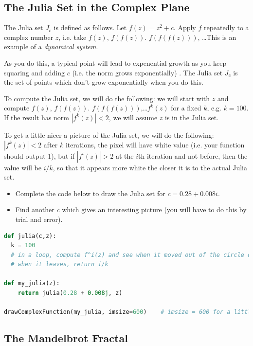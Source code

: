 \documentclass[letterpaper,11pt]{amsart}
\theoremstyle{plain}
\theoremstyle{definition}
\begin{document}
\subsection*{The Julia Set in the Complex Plane} 

The Julia set $J_c$ is defined as follows. Let $f(z) = z^2 + c$. Apply $f$ repeatedly to a complex number $z$, i.e. take $f(z)$, $f(f(z))$. $f(f(f(z)))$, \dots This is an example of a \emph{dynamical system}. 

As you do this, a typical point will lead to expenential growth as you keep squaring and adding $c$ (i.e. the norm grows exponentially) . The Julia set $J_c$ is the set of points which don't grow exponentially when you do this.  

To compute the Julia set, we will do the following: we will start with $z$ and compute  $f(z)$, $f(f(z))$. $f(f(f(z)))$,\dots $f^k(z)$ for a fixed $k$, e.g. $k = 100$. If the result has norm $|f^k(z)| < 2$, we will assume $z$ is in the Julia set. 

To get a little nicer a picture of the Julia set, we will do the following:  $|f^k(z)| < 2$ after $k$ iterations, the pixel will have white value (i.e. your function should output 1), but if $|f^i(z)| > 2$ at the $i$th iteration and not before, then the value will be $i/k$, so that it appears more white the closer it is to the actual Julia set.

\begin{itemize}
  \item Complete the code below to draw the Julia set for $c = 0.28 + 0.008i$.
  \item Find another $c$ which gives an interesting picture (you will have to do this by trial and error).
\end{itemize}


\begin{lstlisting}[language=python]
def julia(c,z):
  k = 100
  # in a loop, compute f^i(z) and see when it moved out of the circle of radius 2
  # when it leaves, return i/k

def my_julia(z):
    return julia(0.28 + 0.008j, z)

drawComplexFunction(my_julia, imsize=600)    # imsize = 600 for a little better resolution
\end{lstlisting}

\subsection*{The Mandelbrot Fractal}
\end{document}
